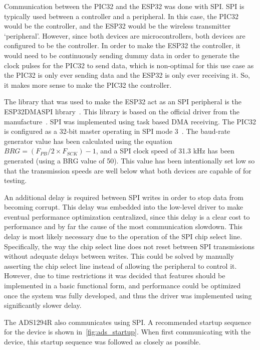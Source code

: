 Communication between the PIC32 and the ESP32 was done with SPI.
SPI is typically used between a controller and a peripheral.
In this case, the PIC32 would be the controller, and the ESP32 would be the wireless transmitter `peripheral'.
However, since both devices are microcontrollers, both devices are configured to be the controller.
In order to make the ESP32 the controller,
it would need to be continuously sending dummy data in order to generate the clock pulses for the PIC32 to send data,
which is non-optimal for this use case as the PIC32 is only ever sending data and the ESP32 is only ever receiving it.
So, it makes more sense to make the PIC32 the controller.

The library that was used to make the ESP32 act as an SPI peripheral is the ESP32DMASPI library~\cite{ESP32DMASPI}.
This library is based on the official driver from the manufacture~\cite{SPI}.
SPI was implemented using task based DMA receiving.
The PIC32 is configured as a 32-bit master operating in SPI mode 3~\cite{Barry:2012}.
The baud-rate generator value has been calculated using the equation \(BRG = (F_{PB} / 2 \times F_{SCK}) - 1\),
and a SPI clock speed of 31.3 kHz has been generated (using a BRG value of 50).
This value has been intentionally set low so that the transmission speeds are well below what both devices are capable of for testing.

An additional delay is required between SPI writes in order to stop data from becoming corrupt.
This delay was embedded into the low-level driver to make eventual performance optimization centralized,
since this delay is a clear cost to performance and by far the cause of the most communication slowdown.
This delay is most likely necessary due to the operation of the SPI chip select line.
Specifically, the way the chip select line does not reset between SPI transmissions without adequate delays between writes.
This could be solved by manually asserting the chip select line instead of allowing the peripheral to control it.
However, due to time restrictions it was decided that features should be implemented in a basic functional form,
and performance could be optimized once the system was fully developed,
and thus the driver was implemented using significantly slower delay.

The ADS1294R also communicates using SPI.
A recommended startup sequence for the device is shown in~\autoref{fig:ads_startup}.
When first communicating with the device, this startup sequence was followed as closely as possible.

